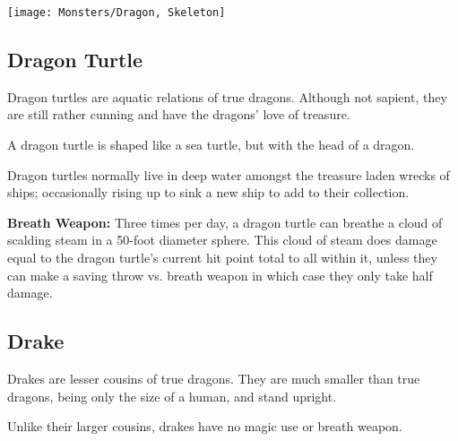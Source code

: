 \begin{multicols*}{2}
\texttt{[image: Monsters/Dragon, Skeleton]}

\subsection{Dragon Turtle}

Dragon turtles are aquatic relations of true dragons. Although not sapient, they are still rather cunning and have the dragons’ love of treasure.

A dragon turtle is shaped like a sea turtle, but with the head of a dragon.

Dragon turtles normally live in deep water amongst the treasure laden wrecks of ships; occasionally rising up to sink a new ship to add to their collection.

\textbf{Breath Weapon:} Three times per day, a dragon turtle can breathe a cloud of scalding steam in a 50-foot diameter sphere. This cloud of steam does damage equal to the dragon turtle’s current hit point total to all within it, unless they can make a saving throw vs. breath weapon in which case they only take half damage.

\subsection{Drake}
Drakes are lesser cousins of true dragons. They are much smaller than true dragons, being only the size of a human, and stand upright.

Unlike their larger cousins, drakes have no magic use or breath weapon.


\end{multicols*}
